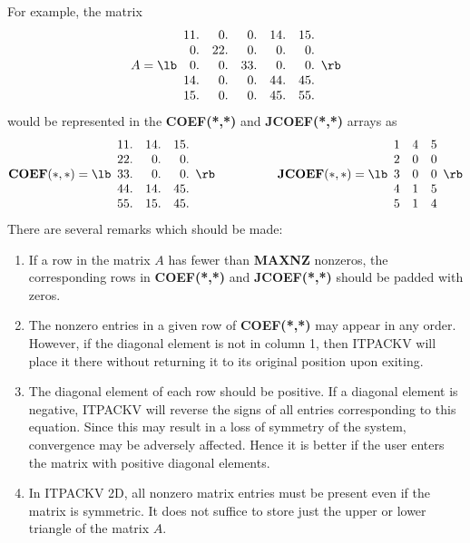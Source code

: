 For example, the matrix
\[ A = \lb \begin{array}{rrrrr} 
               11. &  0. &  0. & 14. & 15. \\
                0. & 22. &  0. &  0. &  0. \\
                0. &  0. & 33. &  0. &  0. \\
               14. &  0. &  0. & 44. & 45. \\
               15. &  0. &  0. & 45. & 55. 
           \end{array} \rb \]
would be represented in the {\bf COEF(*,*)} and {\bf JCOEF(*,*)} 
arrays as
\[ {\bf COEF(*,*)} = \lb \begin{array}{rrr} 
               11. & 14. & 15. \\
               22. &  0. &  0. \\
               33. &  0. &  0. \\
               44. & 14. & 45. \\
               55. & 15. & 45.
 \end{array} \rb \hspace*{0.7in} {\bf JCOEF(*,*)} = \lb \begin{array}{rrr}
                1 & 4 & 5 \\
                2 & 0 & 0 \\
                3 & 0 & 0 \\
                4 & 1 & 5 \\
                5 & 1 & 4
    \end{array} \rb \] 
There are several remarks which should be made:

\bigskip 
\begin{enumerate}
 \item If a row in the matrix $A$ has fewer than {\bf MAXNZ} 
       nonzeros, the corresponding rows in {\bf COEF(*,*)} and 
       {\bf JCOEF(*,*)} should be padded with zeros.
 
 \item The nonzero entries in a given row of {\bf COEF(*,*)} may appear 
       in any order.  However, if the diagonal element is not in
       column 1, then ITPACKV will place it there without returning
       it to its original position upon exiting.
 
 \item The diagonal element of each row should be positive.  If
       a diagonal element is negative, ITPACKV will reverse the
       signs of all entries corresponding to this equation.
       Since this may result in a loss of symmetry of the system,
       convergence may be adversely affected.  Hence it is better
       if the user enters the matrix with positive diagonal elements.
 
 \item In ITPACKV 2D, all nonzero matrix entries must be present
       even if the matrix is symmetric.  It does not suffice
       to store just the upper or lower triangle of the matrix $A$.
 
\end{enumerate}
 
